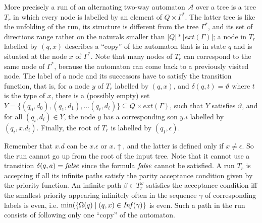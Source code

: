 \documentclass[a4paper,UKenglish,cleveref, autoref, thm-restate]{lipics-v2021}
\begin{document}
More precisely a run of an alternating two-way automaton $\mathcal{A}$ over a tree
is
a tree $T_r$ in which every node is labelled by an
element of $Q \times \Gamma^*$. The latter tree is like the unfolding of the run, its structure
is different from the tree $\Gamma^*$, and its set of directions range rather on the naturals smaller than $|Q|*|ext(\Gamma)|$; a node in $T_r$ labelled by $(q,x)$ describes a “copy”
of the automaton that is in state $q$ and is situated at the node $x$ of $\Gamma^*$. 
Note
that many nodes of $T_r$ can correspond to the same node of $\Gamma^*$, because the
automaton can come back to a previously visited node. 
The label of a node
and its successors have to satisfy the transition function,
that is, for a node $y$ of $T_r$ labelled by $(q,x)$, and $\delta(q,t)= \vartheta$ where $t$ is the type of $x$, there is a (possibly empty) set 
 $Y = \{ (q_0,d_0),(q_1,d_1), \ldots (q_\ell, d_\ell) \}  \subseteq  Q \times ext(\Gamma)$, such that $Y$ satisfies  $\vartheta $, and for all
$(q_i,d_i)  \in  Y$, the node $y$ has a corresponding son $y.i$ labelled by $(q_i,x.d_i)$. Finally, the root of $T_r$ is labelled by $(q_I,\epsilon)$.



Remember that $x.d$ can be $x. \epsilon$  or $x. \! \uparrow$, and the latter is defined only if 
$x  \neq   \epsilon $.
So the run cannot go up from the root of the input tree. Note that it cannot use a
transition  $\delta (q, a) = \text{\textit{false}}$ since the formula $\text{\textit{false}}$ cannot be satisfied.
A run $T_r$ is accepting if all its infinite paths satisfy the parity acceptance 
condition
given by the priority function. 
An infinite path $ \beta   \in  T_r^{\omega}$  satisfies the acceptance condition iff the smallest priority appearing infinitely often in
the sequence $\gamma$ of corresponding labels
 is even, i.e.
 $\min(\{ \Omega(q) \mid (q,x) \in \text{\textit{Inf}}(\gamma) \} $ is even. 
Such
a path in the run consists of following only one “copy” of the automaton. 


\end{document}
